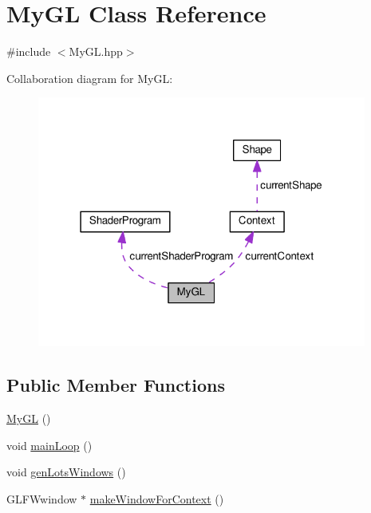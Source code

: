 \hypertarget{classMyGL}{}\section{My\+G\+L Class Reference}
\label{classMyGL}


{\ttfamily \#include $<$My\+G\+L.\+hpp$>$}



Collaboration diagram for My\+G\+L\+:
\nopagebreak
\begin{figure}[H]
\begin{center}
\leavevmode
\includegraphics[width=307pt]{classMyGL__coll__graph}
\end{center}
\end{figure}
\subsection*{Public Member Functions}
\begin{DoxyCompactItemize}
\item 
\hyperlink{classMyGL_abb621dca31a152540b416deadf23037c}{My\+G\+L} ()
\item 
void \hyperlink{classMyGL_a4c37ec888e514cc8d06b7bc0ea7e73bd}{main\+Loop} ()
\item 
void \hyperlink{classMyGL_af7fa10909864af7f8417cf12553ba456}{gen\+Lots\+Windows} ()
\item 
G\+L\+F\+Wwindow $\ast$ \hyperlink{classMyGL_a9f2cc53d2c05eceb1d433bb0b19d9db8}{make\+Window\+For\+Context} ()
\end{DoxyCompactItemize}
